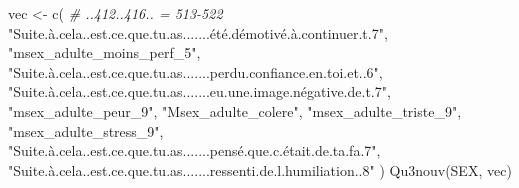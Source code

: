\documentclass[
]{article}
\newenvironment{Shaded}{\begin{snugshade}}{\end{snugshade}}
\newcommand{\CommentTok}[1]{\textcolor[rgb]{0.56,0.35,0.01}{\textit{#1}}}
\newcommand{\FunctionTok}[1]{\textcolor[rgb]{0.00,0.00,0.00}{#1}}
\newcommand{\NormalTok}[1]{#1}
\newcommand{\OtherTok}[1]{\textcolor[rgb]{0.56,0.35,0.01}{#1}}
\newcommand{\StringTok}[1]{\textcolor[rgb]{0.31,0.60,0.02}{#1}}
\begin{document}
\begin{Shaded}
\begin{Highlighting}[]
\NormalTok{vec }\OtherTok{\textless{}{-}} \FunctionTok{c}\NormalTok{(  }\CommentTok{\# ..412..416.. = 513{-}522}
  \StringTok{"Suite.à.cela..est.ce.que.tu.as.......été.démotivé.à.continuer.t.7"}\NormalTok{,}
  \StringTok{"msex\_adulte\_moins\_perf\_5"}\NormalTok{,}
  \StringTok{"Suite.à.cela..est.ce.que.tu.as.......perdu.confiance.en.toi.et..6"}\NormalTok{,}
  \StringTok{"Suite.à.cela..est.ce.que.tu.as.......eu.une.image.négative.de.t.7"}\NormalTok{,}
  \StringTok{"msex\_adulte\_peur\_9"}\NormalTok{,}
  \StringTok{"Msex\_adulte\_colere"}\NormalTok{,}
  \StringTok{"msex\_adulte\_triste\_9"}\NormalTok{,}
  \StringTok{"msex\_adulte\_stress\_9"}\NormalTok{,}
  \StringTok{"Suite.à.cela..est.ce.que.tu.as.......pensé.que.c.était.de.ta.fa.7"}\NormalTok{,}
  \StringTok{"Suite.à.cela..est.ce.que.tu.as.......ressenti.de.l.humiliation..8"}
\NormalTok{  )}
\FunctionTok{Qu3nouv}\NormalTok{(SEX, vec)}
\end{Highlighting}
\end{Shaded}
\end{document}
